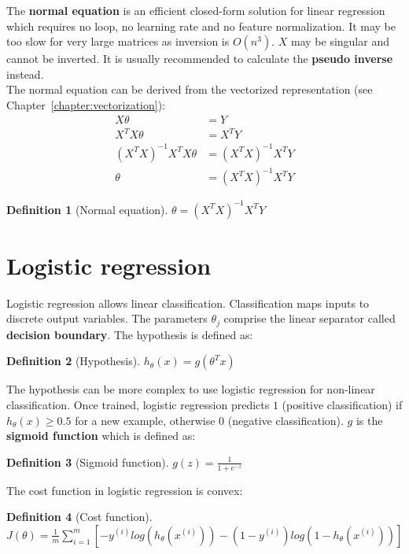 \documentclass{report}
\newtheorem{definition}{Definition}[section]
\begin{document}
The {\bf normal equation} is an efficient closed-form solution for linear regression which requires no loop, no learning rate and no feature normalization.
It may be too slow for very large matrices as inversion is $O(n^3)$. $X$ may be singular and cannot be inverted.
It is usually recommended to calculate the {\bf pseudo inverse} instead. \\
The normal equation can be derived from the vectorized representation (see Chapter~\ref{chapter:vectorization}):
\begin{align*}
X\theta &= Y \\
X^T X\theta &= X^T Y \\
(X^T X)^{-1} X^T X\theta &= (X^T X)^{-1} X^T Y \\
\theta &= (X^T X)^{-1}X^T Y
\end{align*}

\begin{definition}[Normal equation]
$\theta = (X^{T}X)^{-1}X^{T}Y$
\end{definition}

\section{Logistic regression}

Logistic regression allows linear classification. Classification maps inputs to discrete output variables.
The parameters $\theta_j$ comprise the linear separator called {\bf decision boundary}. The hypothesis is defined as:
\begin{definition}[Hypothesis]
$h_\theta(x) = g(\theta^{T}x)$
\end{definition}

The hypothesis can be more complex to use logistic regression for non-linear classification. Once trained, logistic regression predicts $1$ (positive classification) if $h_\theta(x) \ge 0.5$ for a new example, otherwise $0$ (negative classification). $g$ is the {\bf sigmoid function} which is defined as:
\begin{definition}[Sigmoid function]
$g(z) = \frac{1}{1 + e^{-z}}$
\end{definition}

The cost function in logistic regression is convex:
\begin{definition}[Cost function] ~\\
$J(\theta) = \frac{1}{m}\sum_{i=1}^m[-y^{(i)}log(h_{\theta}(x^{(i)}))-(1-y^{(i)})log(1-h_{\theta}(x^{(i)}))]$
\end{definition}
\end{document}
